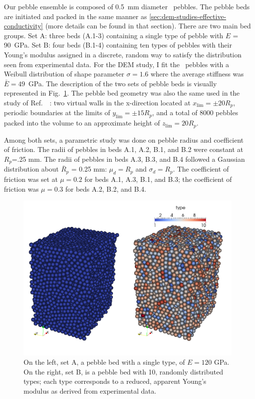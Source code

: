 Our pebble ensemble is composed of \SI{0.5}{\milli\meter} diameter \lis~pebbles. The pebble beds are initiated and packed in the same manner as \cref{sec:dem-studies-effective-conductivity} (more details can be found in that section). There are two main bed groups. Set A: three beds (A.1-3) containing a single type of pebble with $E$ = \si{90 GPa}. Set B: four beds (B.1-4) containing ten types of pebbles with their Young's modulus assigned in a discrete, random way to satisfy the distribution seen from experimental data. For the DEM study, I fit the \lis~pebbles with a Weibull distribution of shape parameter $\sigma = 1.6$ where the average stiffness was $\bar{E} = 49$~GPa. The description of the two sets of pebble beds is visually represented in Fig.~\ref{fig:dem-types}. The pebble bed geometry was also the same used in the study of Ref.~\cite{VanLew2014}~: two virtual walls in the x-direction located at $x_\text{lim} = \pm 20 R_p$, periodic boundaries at the limits of $y_\text{lim} = \pm 15 R_p$, and a total of 8000 pebbles packed into the volume to an approximate height of $z_\text{lim} = 20 R_p$.

Among both sets, a parametric study was done on pebble radius and coefficient of friction. The radii of pebbles in beds A.1, A.2, B.1, and B.2 were constant at $R_p$=.25 mm. The radii of pebbles in beds A.3, B.3, and B.4 followed a Gaussian distribution about $\bar{R}_p$ = 0.25 mm: $\mu_d = R_p$ and $\sigma_d = R_p$. The coefficient of friction was set at $\mu = 0.2$ for beds A.1, A.3, B.1, and B.3; the coefficient of friction was $\mu = 0.3$ for beds A.2, B.2, and B.4.


\begin{figure}[t]
  \centering
  \includegraphics[width=\singleimagewidth]{chapters/figures/DEM-types}
  \caption{On the left, set A, a pebble bed with a single type, of $E = 120$ GPa. On the right, set B, is a pebble bed with 10, randomly distributed types; each type corresponds to a reduced, apparent Young's modulus as derived from experimental data.}\label{fig:dem-types}
\end{figure}





